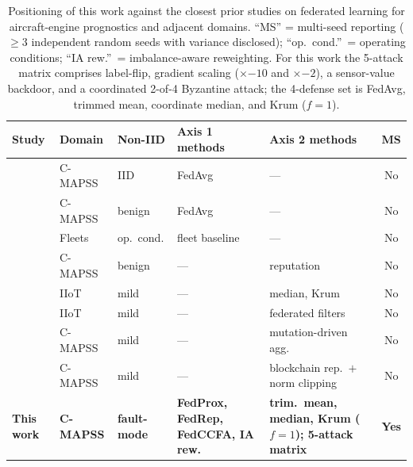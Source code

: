 \documentclass[preprint,12pt,authoryear]{elsarticle}
\begin{document}
\begin{table}[!ht]
\centering
\footnotesize
\setlength{\tabcolsep}{4pt}
\renewcommand{\arraystretch}{1.2}
\caption{Positioning of this work against the closest prior
studies on federated learning for aircraft-engine prognostics
and adjacent domains. ``MS'' = multi-seed reporting
($\geq 3$ independent random seeds with variance disclosed);
``op.\ cond.''\ = operating conditions;
``IA rew.''\ = imbalance-aware reweighting.
For this work the 5-attack matrix comprises label-flip,
gradient scaling ($\times{-10}$ and $\times{-2}$), a
sensor-value backdoor, and a coordinated 2-of-4 Byzantine
attack; the 4-defense set is FedAvg, trimmed mean, coordinate
median, and Krum ($f = 1$).}
\label{tab:positioning}
\begin{tabular}{@{}>{\raggedright\arraybackslash}p{3.6cm} l l >{\raggedright\arraybackslash}p{2.5cm} >{\raggedright\arraybackslash}p{2.8cm} c@{}}
\toprule
Study & Domain & Non-IID & Axis 1 methods & Axis 2 methods & MS \\
\midrule
\citet{Barbosa2025FLJetEngines}       & C-MAPSS  & IID          & FedAvg              & ---                                     & No \\
\citet{Vermelin2024CollabFLRUL}       & C-MAPSS  & benign       & FedAvg              & ---                                     & No \\
\citet{Pandhare2021FederatedBaseline} & Fleets   & op.\ cond.   & fleet baseline      & ---                                     & No \\
\citet{Rehman2021TrustFed}            & C-MAPSS  & benign       & ---                 & reputation                              & No \\
\citet{Li2021ByzantineFLIIoT}         & IIoT     & mild         & ---                 & median, Krum                            & No \\
\citet{Hou2021FederatedFiltersIIoT}   & IIoT     & mild         & ---                 & federated filters                       & No \\
\citet{Tallat2026BioMutFedPlus}       & C-MAPSS  & mild         & ---                 & mutation-driven agg.                    & No \\
\citet{Li2026TrustworthyFLIIoT}       & C-MAPSS  & mild         & ---                 & blockchain rep.\ $+$ norm clipping      & No \\
\midrule
\textbf{This work} & \textbf{C-MAPSS} & \textbf{fault-mode} & \textbf{FedProx, FedRep, FedCCFA, IA rew.} & \textbf{trim.\ mean, median, Krum ($f{=}1$); 5-attack matrix} & \textbf{Yes} \\
\bottomrule
\end{tabular}
\end{table}
\end{document}
